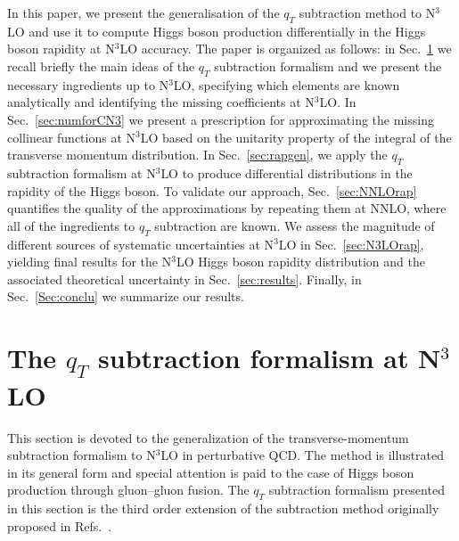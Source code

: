 \documentclass[12pt]{article}
\DeclareRobustCommand{\qt}{q_T}
\begin{document}
In this paper, we present the generalisation of the $\qt$ subtraction method to N$^{3}$LO and use it to compute Higgs boson production differentially in the Higgs boson rapidity at N$^{3}$LO accuracy. The paper is organized as follows: in Sec.~\ref{sec:forma} we recall briefly the main ideas of the $\qt$ subtraction formalism and we present the necessary ingredients up to  N$^{3}$LO, specifying which elements are known analytically and identifying the missing coefficients at N$^{3}$LO. In Sec.~\ref{sec:numforCN3} we present a prescription for approximating the missing collinear functions at N$^{3}$LO based on the unitarity property of the integral of the transverse momentum distribution. In Sec.~\ref{sec:rapgen}, we apply the $\qt$ subtraction formalism at N$^{3}$LO to produce differential distributions in the rapidity of the Higgs boson. To validate our approach, Sec.~\ref{sec:NNLOrap} quantifies the quality of the approximations by repeating them at NNLO, where all of the ingredients to $\qt$ subtraction are known. We assess the magnitude of different sources of systematic uncertainties at  N$^{3}$LO in Sec.~\ref{sec:N3LOrap}, yielding final results for the N$^{3}$LO Higgs boson rapidity distribution and the associated theoretical uncertainty in Sec.~\ref{sec:results}. Finally, in Sec.~\ref{Sec:conclu} we summarize our results.




\section{The \texorpdfstring{$\qt$}{qT} subtraction formalism at \texorpdfstring{N${}^\text{3}$LO}{N3LO}}
\label{sec:forma}
This section is devoted to the generalization of the transverse-momentum subtraction formalism to N$^{3}$LO in perturbative QCD. The method is illustrated in its general form and special attention is paid to the case of Higgs boson production through gluon--gluon fusion. The $\qt$ subtraction formalism presented in this section is the third order extension of the subtraction method originally proposed in Refs.~\cite{Catani:2007vq,Bozzi:2005wk,Bonciani:2015sha}.
\end{document}

